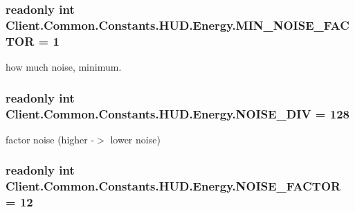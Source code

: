 \subsubsection[{M\+I\+N\+\_\+\+N\+O\+I\+S\+E\+\_\+\+F\+A\+C\+T\+O\+R}]{\setlength{\rightskip}{0pt plus 5cm}readonly int Client.\+Common.\+Constants.\+H\+U\+D.\+Energy.\+M\+I\+N\+\_\+\+N\+O\+I\+S\+E\+\_\+\+F\+A\+C\+T\+O\+R = 1\hspace{0.3cm}{\ttfamily [static]}}\label{classClient_1_1Common_1_1Constants_1_1HUD_1_1Energy_ab7aaf06c6379be774b2709f67277b903}


how much noise, minimum. 

\hypertarget{classClient_1_1Common_1_1Constants_1_1HUD_1_1Energy_a82587d17d69f23eebb8f995dec7d873e}{}
\subsubsection[{N\+O\+I\+S\+E\+\_\+\+D\+I\+V}]{\setlength{\rightskip}{0pt plus 5cm}readonly int Client.\+Common.\+Constants.\+H\+U\+D.\+Energy.\+N\+O\+I\+S\+E\+\_\+\+D\+I\+V = 128\hspace{0.3cm}{\ttfamily [static]}}\label{classClient_1_1Common_1_1Constants_1_1HUD_1_1Energy_a82587d17d69f23eebb8f995dec7d873e}


factor noise (higher -\/$>$ lower noise) 

\hypertarget{classClient_1_1Common_1_1Constants_1_1HUD_1_1Energy_a5e84260f9c2817e8da7770afb26da087}{}
\subsubsection[{N\+O\+I\+S\+E\+\_\+\+F\+A\+C\+T\+O\+R}]{\setlength{\rightskip}{0pt plus 5cm}readonly int Client.\+Common.\+Constants.\+H\+U\+D.\+Energy.\+N\+O\+I\+S\+E\+\_\+\+F\+A\+C\+T\+O\+R = 12\hspace{0.3cm}{\ttfamily [static]}}\label{classClient_1_1Common_1_1Constants_1_1HUD_1_1Energy_a5e84260f9c2817e8da7770afb26da087}



